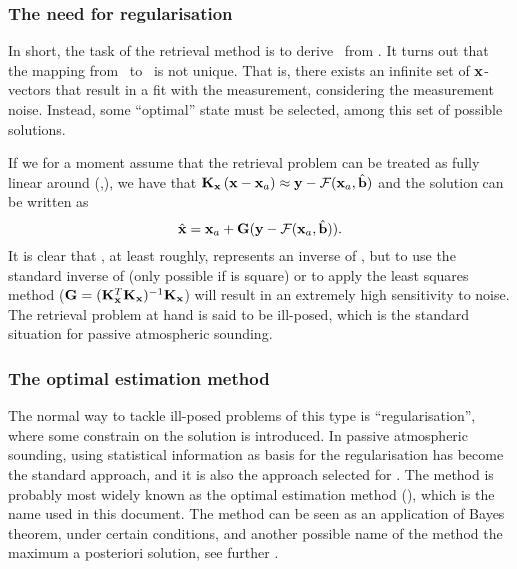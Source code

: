 \subsubsection{The need for regularisation}
\label{sec:setup:inverse:reg}
%
In short, the task of the retrieval method is to derive \RtrVct\ from \MsrVct.
It turns out that the mapping from \MsrVct\ to \RtrVct\ is not unique. That is,
there exists an infinite set of $\mathbf{x}$-vectors that result in a fit with the
measurement, considering the measurement noise. Instead, some ``optimal'' state
must be selected, among this set of possible solutions.

If we for a moment assume that the retrieval problem can be treated as fully
linear around (,\FrwMdlVctHat), we
have that $\mathbf{K}_{\mathbf{x}}\left(\mathbf{x}-\mathbf{x}_{a}\right)\approx \mathbf{y}
-\mathcal{F}(\mathbf{x}_{a},\hat{\mathbf{b}})$ and the solution can be written as
\begin{equation}
  \label{eq:linretrieval}
  \hat{\mathbf{x}} = \mathbf{x}_{a} + \mathbf{G}(\mathbf{y}-\mathcal{F}(\mathbf{x}_{a},\hat{\mathbf{b}})).
\end{equation}
It is clear that \CtrFncMtr, at least roughly, represents an inverse of
\aWfnMtr{\SttVct}, but to use the standard inverse of \aWfnMtr{\SttVct} (only
possible if \aWfnMtr{\SttVct} is square) or to apply the least squares method
($\mathbf{G}=(\mathbf{K}_{\mathbf{x}}^T\mathbf{K}_{\mathbf{x}})^{-1}\mathbf{K}_{\mathbf{x}}$)
will result in an extremely high sensitivity to noise. The retrieval problem at
hand is said to be ill-posed, which is the standard situation for passive
atmospheric sounding.


\subsubsection{The optimal estimation method}
\label{sec:setup:inverse:oem}
%
The normal way to tackle ill-posed problems of this type is
``regularisation'', where some constrain on the solution is introduced. In
passive atmospheric sounding, using statistical information as basis for the
regularisation has become the standard approach, and it is also the approach
selected for \smr. The method is probably most widely known as the optimal
estimation method (\OEM), which is the name used in this document. The method
can be seen as an application of Bayes theorem, under certain conditions, and
another possible name of the method the maximum a posteriori solution, see
further \citet{rodgers:00}.

